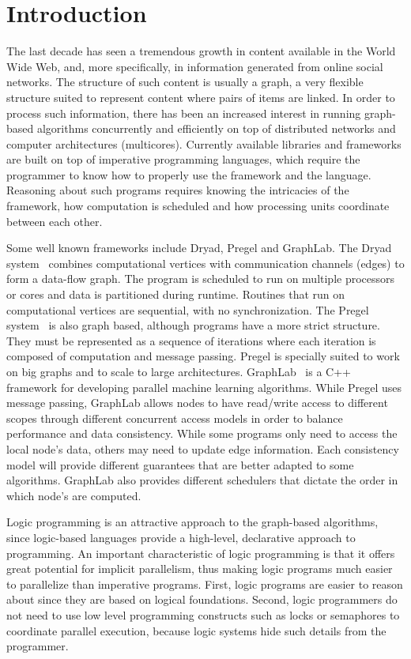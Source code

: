 \section{Introduction}

The last decade has seen a tremendous growth in content available in
the World Wide Web, and, more specifically, in information generated
from online social networks. The structure of such content is usually
a graph, a very flexible structure suited to represent content where
pairs of items are linked.  In order to process such information,
there has been an increased interest in running graph-based algorithms
concurrently and efficiently on top of distributed networks and
computer architectures (multicores).  Currently available libraries
and frameworks are built on top of imperative programming languages,
which require the programmer to know how to properly use the framework
and the language. Reasoning about such programs requires knowing the
intricacies of the framework, how computation is scheduled and how
processing units coordinate between each other.

Some well known frameworks include Dryad, Pregel and GraphLab.  The
Dryad system~\cite{Isard:2007:DDD:1272996.1273005} combines
computational vertices with communication channels (edges) to form a
data-flow graph. The program is scheduled to run on multiple
processors or cores and data is partitioned during runtime. Routines
that run on computational vertices are sequential, with no
synchronization.  The Pregel
system~\cite{Malewicz:2010:PSL:1807167.1807184} is also graph based,
although programs have a more strict structure. They must be
represented as a sequence of iterations where each iteration is
composed of computation and message passing.  Pregel is specially
suited to work on big graphs and to scale to large architectures.
GraphLab~\cite{GraphLab2010} is a C++ framework for developing
parallel machine learning algorithms. While Pregel uses message
passing, GraphLab allows nodes to have read/write access to different
scopes through different concurrent access models in order to balance
performance and data consistency. While some programs only need to
access the local node's data, others may need to update edge
information. Each consistency model will provide different guarantees
that are better adapted to some algorithms. GraphLab also provides
different schedulers that dictate the order in which node's are
computed.

Logic programming is an attractive approach to the graph-based algorithms,
since logic-based languages provide a high-level, declarative approach
to programming. An important characteristic of logic programming is
that it offers great potential for implicit parallelism, thus making
logic programs much easier to parallelize than imperative
programs. First, logic programs are easier to reason about since they
are based on logical foundations. Second, logic programmers do not
need to use low level programming constructs such as locks or
semaphores to coordinate parallel execution, because logic systems
hide such details from the programmer.

